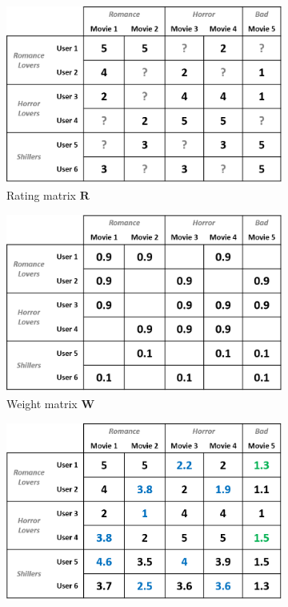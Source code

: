 \documentclass[master,english,final]{kaist-ucs}
\begin{document}
\begin{figure}[h]
    \centering
    \begin{subfigure}[b]{0.3\textwidth}
        \centering
        \includegraphics[width=\textwidth]{figure/mf_after_rating}
        \caption{Rating matrix $\bm{R}$}
    \end{subfigure}
    \begin{subfigure}[b]{0.3\textwidth}
        \centering
        \includegraphics[width=\textwidth]{figure/wmf_good_weight}
        \caption{Weight matrix $\bm{W}$}
        \label{wmf_good_weight}
    \end{subfigure}
    \begin{subfigure}[b]{0.3\textwidth}
        \centering
        \includegraphics[width=\textwidth]{figure/wmf_good_prediction}

\end{subfigure}
\end{figure}
\end{document}
